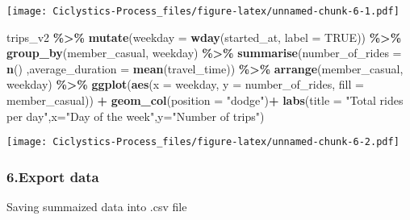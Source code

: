 \documentclass[
]{article}
\newenvironment{Shaded}{\begin{snugshade}}{\end{snugshade}}
\newcommand{\AttributeTok}[1]{\textcolor[rgb]{0.13,0.29,0.53}{#1}}
\newcommand{\ConstantTok}[1]{\textcolor[rgb]{0.56,0.35,0.01}{#1}}
\newcommand{\ControlFlowTok}[1]{\textcolor[rgb]{0.13,0.29,0.53}{\textbf{#1}}}
\newcommand{\FunctionTok}[1]{\textcolor[rgb]{0.13,0.29,0.53}{\textbf{#1}}}
\newcommand{\NormalTok}[1]{#1}
\newcommand{\OtherTok}[1]{\textcolor[rgb]{0.56,0.35,0.01}{#1}}
\newcommand{\SpecialCharTok}[1]{\textcolor[rgb]{0.81,0.36,0.00}{\textbf{#1}}}
\newcommand{\StringTok}[1]{\textcolor[rgb]{0.31,0.60,0.02}{#1}}
\begin{document}
\texttt{[image: Ciclystics-Process\_files/figure-latex/unnamed-chunk-6-1.pdf]}

\begin{Shaded}
\begin{Highlighting}[]
\NormalTok{trips\_v2 }\SpecialCharTok{\%\textgreater{}\%} 
  \FunctionTok{mutate}\NormalTok{(}\AttributeTok{weekday =} \FunctionTok{wday}\NormalTok{(started\_at, }\AttributeTok{label =} \ConstantTok{TRUE}\NormalTok{)) }\SpecialCharTok{\%\textgreater{}\%} 
  \FunctionTok{group\_by}\NormalTok{(member\_casual, weekday) }\SpecialCharTok{\%\textgreater{}\%} 
  \FunctionTok{summarise}\NormalTok{(}\AttributeTok{number\_of\_rides =} \FunctionTok{n}\NormalTok{()}
\NormalTok{            ,}\AttributeTok{average\_duration =} \FunctionTok{mean}\NormalTok{(travel\_time)) }\SpecialCharTok{\%\textgreater{}\%} 
  \FunctionTok{arrange}\NormalTok{(member\_casual, weekday)  }\SpecialCharTok{\%\textgreater{}\%} 
  \FunctionTok{ggplot}\NormalTok{(}\FunctionTok{aes}\NormalTok{(}\AttributeTok{x =}\NormalTok{ weekday, }\AttributeTok{y =}\NormalTok{ number\_of\_rides, }\AttributeTok{fill =}\NormalTok{ member\_casual)) }\SpecialCharTok{+}
  \FunctionTok{geom\_col}\NormalTok{(}\AttributeTok{position =} \StringTok{"dodge"}\NormalTok{)}\SpecialCharTok{+} 
  \FunctionTok{labs}\NormalTok{(}\AttributeTok{title =} \StringTok{"Total rides per day"}\NormalTok{,}\AttributeTok{x=}\StringTok{"Day of the week"}\NormalTok{,}\AttributeTok{y=}\StringTok{"Number of trips"}\NormalTok{)}
\end{Highlighting}
\end{Shaded}

\texttt{[image: Ciclystics-Process\_files/figure-latex/unnamed-chunk-6-2.pdf]}

\hypertarget{export-data}{%
\subsubsection{6.Export data}\label{export-data}}

Saving summaized data into .csv file

\begin{Shaded}
\end{Shaded}
\end{document}
